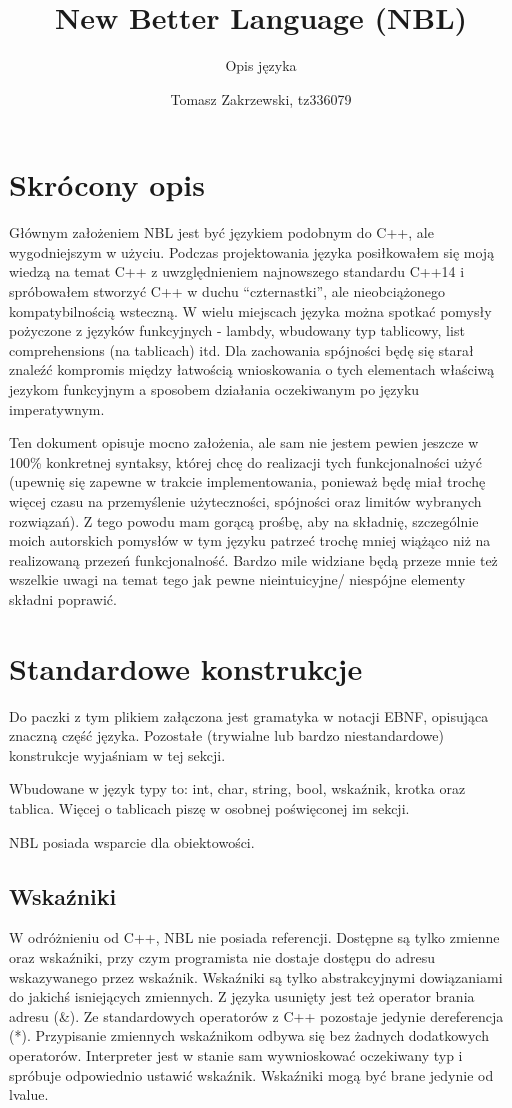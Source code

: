 \documentclass[a4paper,10pt]{scrartcl}
\title{New Better Language (NBL)}
\subtitle{Opis języka}
\author{Tomasz Zakrzewski, tz336079}
\begin{document}
\maketitle

\section{Skrócony opis}
Głównym założeniem NBL jest być językiem podobnym do C++, ale wygodniejszym w użyciu. Podczas projektowania języka posiłkowałem się moją wiedzą
na temat C++ z uwzględnieniem najnowszego standardu C++14 i spróbowałem stworzyć C++ w duchu ``czternastki'', ale nieobciążonego kompatybilnością
wsteczną. W wielu miejscach języka można spotkać pomysły pożyczone z języków funkcyjnych - lambdy, wbudowany typ tablicowy, list comprehensions
(na tablicach) itd. Dla zachowania spójności będę się starał znaleźć kompromis między łatwością wnioskowania o tych elementach właściwą jezykom funkcyjnym a sposobem
działania oczekiwanym po języku imperatywnym.

Ten dokument opisuje mocno założenia, ale sam nie jestem pewien jeszcze w 100\% konkretnej syntaksy, której chcę do realizacji tych funkcjonalności
użyć (upewnię się zapewne w trakcie implementowania, ponieważ będę miał trochę więcej czasu na przemyślenie użyteczności, spójności oraz limitów
wybranych rozwiązań). Z tego powodu mam gorącą prośbę, aby na składnię, szczególnie moich autorskich pomysłów w tym języku patrzeć trochę mniej
wiążąco niż na realizowaną przezeń funkcjonalność. Bardzo mile widziane będą przeze mnie też wszelkie uwagi na temat tego jak pewne nieintuicyjne/
niespójne elementy składni poprawić.

\section{Standardowe konstrukcje}
Do paczki z tym plikiem załączona jest gramatyka w notacji EBNF, opisująca znaczną część języka. Pozostałe (trywialne lub bardzo niestandardowe)
konstrukcje wyjaśniam w tej sekcji.

Wbudowane w język typy to: int, char, string, bool, wskaźnik, krotka oraz tablica. Więcej o tablicach piszę w osobnej poświęconej im sekcji.

NBL posiada wsparcie dla obiektowości.

\subsection{Wskaźniki}
W odróżnieniu od C++, NBL nie posiada referencji. Dostępne są tylko zmienne oraz wskaźniki, przy czym programista nie dostaje dostępu do adresu
wskazywanego przez wskaźnik. Wskaźniki są tylko abstrakcyjnymi dowiązaniami do jakichś isniejących zmiennych. Z języka usunięty jest też operator
brania adresu (\&). Ze standardowych operatorów z C++ pozostaje jedynie dereferencja (*). Przypisanie zmiennych wskaźnikom odbywa się bez żadnych
dodatkowych operatorów. Interpreter jest w stanie sam wywnioskować oczekiwany typ i spróbuje odpowiednio ustawić wskaźnik. Wskaźniki mogą być brane
jedynie od lvalue.
\end{document}
